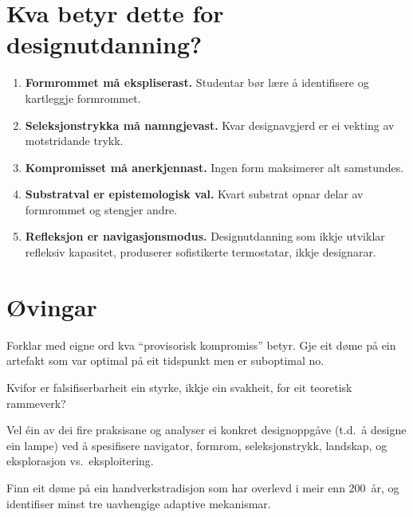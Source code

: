 \section{Kva betyr dette for designutdanning?}

\begin{enumerate}
  \item \textbf{Formrommet må ekspliserast.}
    Studentar bør lære å identifisere og kartleggje formrommet.

  \item \textbf{Seleksjonstrykka må namngjevast.}
    Kvar designavgjerd er ei vekting av motstridande trykk.

  \item \textbf{Kompromisset må anerkjennast.}
    Ingen form maksimerer alt samstundes.

  \item \textbf{Substratval er epistemologisk val.}
    Kvart substrat opnar delar av formrommet og stengjer andre.

  \item \textbf{Refleksjon er navigasjonsmodus.}
    Designutdanning som ikkje utviklar refleksiv kapasitet,
    produserer sofistikerte termostatar, ikkje designarar.
\end{enumerate}


\section{Øvingar}

\begin{exercise}[Nivå 1]\label{ex:9.1}
Forklar med eigne ord kva ``provisorisk kompromiss'' betyr. Gje eit
døme på ein artefakt som var optimal på eit tidspunkt men er
suboptimal no.
\end{exercise}

\begin{exercise}[Nivå 1]\label{ex:9.2}
Kvifor er falsifiserbarheit ein styrke, ikkje ein svakheit, for eit
teoretisk rammeverk?
\end{exercise}

\begin{exercise}[Nivå 2]\label{ex:9.3}
Vel éin av dei fire praksisane og analyser ei konkret
designoppgåve (t.d.\ å designe ein lampe) ved å spesifisere
navigator, formrom, seleksjonstrykk, landskap, og eksplorasjon vs.\
eksploitering.
\end{exercise}

\begin{exercise}[Nivå 2]\label{ex:9.4}
Finn eit døme på ein handverkstradisjon som har overlevd i meir enn
200~år, og identifiser minst tre uavhengige adaptive mekanismar.
\end{exercise}

